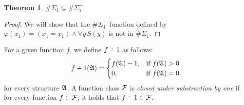 \documentclass[12pt]{article}
\def\dotminus{\mathbin{\ooalign{\hss\raise1ex\hbox{.}\hss\cr
  \mathsurround=0pt$-$}}}
\def\E1{\#\Sigma_1^{+}}
\def\A{{\frak A}}
\def\F{{\cal F}}
\newtheorem{theo}{Theorem}
\begin{document}
\begin{theo}
$\#\Sigma_1 \subsetneq \E1$
\end{theo}
\begin{proof}
We will show that the $\E1$ function defined by $\varphi(x_1) = (x_1 = x_1) \wedge \forall y \, S(y)$ is not in $\#\Sigma_1$.
\end{proof}

For a given function $f$, we define $f \dotminus 1$ as follows:
\begin{eqnarray*}
f \dotminus 1(\A) =
\begin{cases}
f(\A)-1, & \text{if }f(\A) > 0 \\
0, & \text{if }f(\A) = 0.
\end{cases}
\end{eqnarray*}
for every structure $\A$. A function class $\F$ is {\em closed under substraction by one} if for every function $f \in \F$, it holds that $f \dotminus 1 \in \F$.

\end{document}

